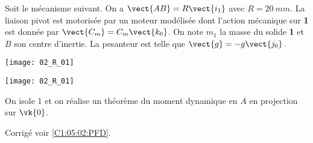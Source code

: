\normaltrue
\correctiontrue


\setcounter{question}{0}
\ifcorrection
\else
{}
\fi

\ifprof
\else
Soit le mécanisme suivant. On a $\vect{AB}=R\vect{i_1}$ avec $R=\SI{20}{mm}$. La liaison pivot est motorisée par un moteur modélisée dont l'action mécanique sur \textbf{1} est donnée par $\vect{C_m}=C_m \vect{k_0}$.
On note $m_1$ la masse du solide \textbf{1} et $B$ son centre d'inertie. 
 La pesanteur est telle que $\vect{g}=-g\vect{j_0}$.

\begin{center}
\texttt{[image: 02\_R\_01]}
\end{center}

\fi
{}
\ifprof
\begin{center}
\texttt{[image: 02\_R\_01]}
\end{center}
\else
\fi

\ifprof
On isole 1 et on réalise un théorème du moment dynamique en $A$ en projection sur $\vk{0}$.
\else
\fi


\ifprof
\else
\begin{flushright}
\footnotesize{Corrigé  voir \ref{C1:05:02:PFD}.}
\end{flushright}%
\fi